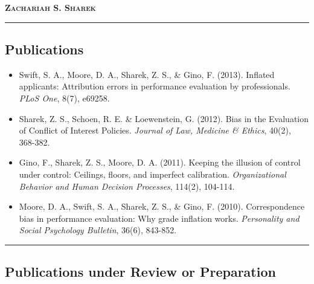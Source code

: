 \documentclass[12pt,letterpaper,oneside]{article}
\makeatletter
\newcommand{\headerrow}[2]
{\begin{tabular*}{\linewidth}{l@{\extracolsep{\fill}}r}
	#1 &
	#2 \\
\end{tabular*}}
\makeatother
\begin{document}
\begin{center}
{\LARGE \textbf{\textsc{Zachariah S. Sharek}}}
\vspace{4mm}

\end{center}
\vspace{-2mm}

\hrule
\vspace{-0.4em}
\subsection*{\centering\textbf{Publications}}

\begin{itemize}
	\parskip=0.1em
	\item Swift, S. A., Moore, D. A., Sharek, Z. S., \& Gino, F. (2013). 
	Inflated applicants: Attribution errors in performance evaluation by professionals. 
	\emph{PLoS One}, 8(7), e69258.
\end{itemize}

\begin{itemize}
	\parskip=0.1em
	\item Sharek, Z. S., Schoen, R. E. \& Loewenstein, G. (2012). Bias in the Evaluation of Conflict of Interest Policies.  
	\emph{Journal of Law, Medicine \& Ethics}, 40(2), 368-382.
\end{itemize}

\begin{itemize}
	\parskip=0.1em
	\item Gino, F., Sharek, Z. S., Moore, D. A. (2011).  Keeping the illusion of control under control: Ceilings, floors, and imperfect calibration.  \emph{Organizational Behavior and Human Decision Processes}, 114(2), 104-114.   
\end{itemize}

\begin{itemize}
	\parskip=0.1em
	\item Moore, D. A., Swift, S. A., Sharek, Z. S., \& Gino, F. (2010). Correspondence bias in performance evaluation: Why grade inflation works. \emph{Personality and Social Psychology Bulletin}, 36(6), 843-852.
\end{itemize}

\hrule
\vspace{-0.4em}
\subsection*{\centering\textbf{Publications under Review or Preparation}}
\end{document}

